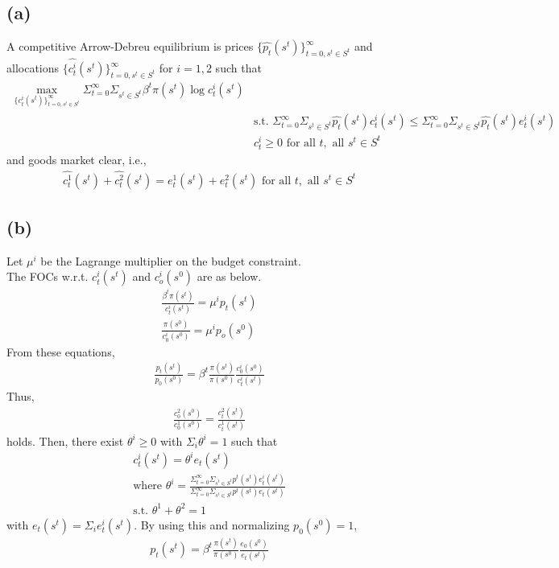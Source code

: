 \documentclass[a4paper]{article}
\begin{document}
\section{} %

\subsection*{(a)}
A competitive Arrow-Debreu equilibrium is prices $\{\hat{p_t}(s^t)\}_{t=0, s^t \in S^t}^\infty$ and allocations $\{\hat{c_t^i}(s^t)\}_{t=0, s^t \in S^t}^\infty$ for $i = 1, 2$ such that
\begin{align*}
    \max_{\{c_t^i(s^t)\}_{t=0, s^t \in S^t}^\infty} \Sigma_{t=0}^\infty \Sigma_{s^t \in S^t} \beta^t \pi(s^t) \log c^i_t(s^t)\\
    & \text{s.t. }\Sigma_{t=0}^\infty \Sigma_{s^t \in S^t} \hat{p_t}(s^t) c^i_t(s^t) \leq \Sigma_{t=0}^\infty \Sigma_{s^t \in S^t} \hat{p_t}(s^t) e^i_t(s^t)\\
    & c^i_t \geq 0 \text{ for all }t,\text{ all }s^t \in S^t
\end{align*}
and goods market clear, i.e.,
\begin{align*}
    \hat{c^1_t}(s^t) + \hat{c^2_t}(s^t) = e^1_t(s^t) + e^2_t(s^t) \text{ for all } t, \text{ all } s^t \in S^t
\end{align*}

\subsection*{(b)}
Let $\mu^i$ be the Lagrange multiplier on the budget constraint.\\
The FOCs w.r.t. $c^i_t(s^t)$ and $c_o^i(s^0)$ are as below.
\begin{align*}
    \frac{\beta^t \pi(s^t)}{c^i_t(s^t)} = \mu^i p_t(s^t)\\
    \frac{\pi(s^0)}{c_0^i(s^0)} = \mu^i p_o(s^0)
\end{align*}
From these equations,
\begin{align*}
    \frac{p_t(s^t)}{p_0(s^0)} = \beta^t \frac{\pi(s^t)}{\pi(s^0)} \frac{c_0^i(s^0)}{c_t^i(s^t)}
\end{align*}
Thus,
\begin{align*}
    \frac{c_0^2(s^0)}{c_0^1(s^0)} = \frac{c_t^2(s^t)}{c_t^1(s^t)}
\end{align*}
holds.
Then, there exist $\theta^i \geq 0$ with $\Sigma_i \theta^i = 1$ such that
\begin{align*}
    c_t^i(s^t) = \theta^i e_t(s^t)\\
    \text{where }\theta^i = \frac{\Sigma_{t=0}^\infty \Sigma_{s^t \in S^t} p^t(s^t) e_t^i (s^t)}{\Sigma_{t=0}^\infty \Sigma_{s^t \in S^t} p^t(s^t) e_t (s^t)}\\
    \text{s.t. }\theta^1 + \theta^2 = 1
\end{align*}
with $e_t(s^t) = \Sigma_i e_t^i (s^t)$.
By using this and normalizing $p_0(s^0) = 1$,
\begin{align*}
    p_t(s^t) = \beta^t \frac{\pi(s^t)}{\pi(s^0)}\frac{e_0(s^0)}{e_t(s^t)}
\end{align*}
\end{document}

